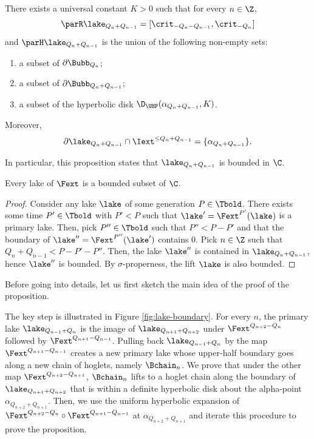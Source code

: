 \documentclass{amsart}
\begin{document}
\begin{proposition}
\label{prop:lake-bounds-0}
    There exists a universal constant $K>0$ such that for every $n \in \Z$, 
    \[
        \parR \lake_{Q_n + Q_{n-1}} = [\crit_{-Q_n-Q_{n-1}},\crit_{-Q_n}]
    \]
    and $\parH \lake_{Q_n +Q_{n-1}}$ is the union of the following non-empty sets:
    \begin{enumerate}
        \item a subset of $\partial \Bubb_{Q_n}$;
        \item a subset of $\partial \Bubb_{Q_n + Q_{n-1}}$;
        \item a subset of the hyperbolic disk $\D_{\UHP}(\alpha_{Q_n+Q_{n-1}}, K)$.
    \end{enumerate}
    Moreover,
    \[
    \partial \lake_{Q_n+Q_{n-1}} \cap \Iext^{\leq Q_n+Q_{n-1}} = \{\alpha_{Q_n+Q_{n-1}}\}.
    \]
\end{proposition}

In particular, this proposition states that $\lake_{Q_n+Q_{n-1}}$ is bounded in $\C$.

\begin{corollary}
\label{cor:bounded-lakes}
    Every lake of $\Fext$ is a bounded subset of $\C$.
\end{corollary}

\begin{proof}
    Consider any lake $\lake$ of some generation $P \in \Tbold$. There exists some time $P' \in \Tbold$ with $P' < P$ such that $\lake'=\Fext^{P'}(\lake)$ is a primary lake. 
    Then, pick $P'' \in \Tbold$ such that $P'' < P-P'$ and that the boundary of $\lake'' = \Fext^{P''}(\lake')$ contains $0$. 
    Pick $n \in \Z$ such that $Q_n + Q_{n-1} < P-P'-P''$. 
    Then, the lake $\lake''$ is contained in $\lake_{Q_n+Q_{n-1}}$, 
    hence $\lake''$ is bounded. 
    By $\sigma$-properness, the lift $\lake$ is also bounded.
\end{proof}

Before going into details, let us first sketch the main idea of the proof of the proposition.

The key step is illustrated in Figure \ref{fig:lake-boundary}.
For every $n$, the primary lake $\lake_{Q_{n-1} + Q_{n}}$ is the image of $\lake_{Q_{n+1}+Q_{n+2}}$ under $\Fext^{Q_{n+2}-Q_n}$ followed by $\Fext^{Q_{n+1}-Q_{n-1}}$.
Pulling back $\lake_{Q_{n-1} + Q_{n}}$ by the map $\Fext^{Q_{n+1}-Q_{n-1}}$ creates a new primary lake whose upper-half boundary goes along a new chain of hoglets, namely $\Bchain_n$.
We prove that under the other map $\Fext^{Q_{n+2}-Q_{n+1}}$, $\Bchain_n$ lifts to a hoglet chain along the boundary of $\lake_{Q_{n+1}+Q_{n+2}}$ that is within a definite hyperbolic disk about the alpha-point $\alpha_{Q_{n+2}+Q_{n+1}}$.
Then, we use the uniform hyperbolic expansion of $\Fext^{Q_{n+2}-Q_n} \circ \Fext^{Q_{n+1}-Q_{n-1}}$ at $\alpha_{Q_{n+2}+Q_{n+1}}$ and iterate this procedure to prove the proposition.
\end{document}
